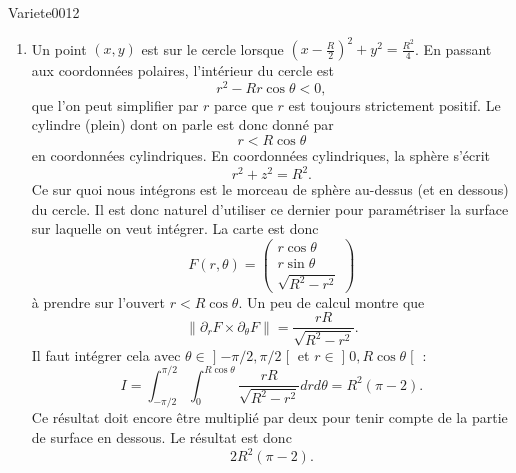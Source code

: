 \begin{corrige}{Variete0012}
\begin{enumerate}
		\item
			Un point $(x,y)$ est sur le cercle lorsque $(x-\frac{ R }{ 2 })^2+y^2=\frac{ R^2 }{ 4 }$. En passant aux coordonnées polaires, l'intérieur du cercle est
			\begin{equation}
				r^2-Rr\cos\theta<0,
			\end{equation}
			que l'on peut simplifier par $r$ parce que $r$ est toujours strictement positif. Le cylindre (plein) dont on parle est donc donné par
			\begin{equation}
				r<R\cos\theta
			\end{equation}
			en coordonnées cylindriques. En coordonnées cylindriques, la sphère s'écrit
			\begin{equation}
				r^2+z^2=R^2.
			\end{equation}
			Ce sur quoi nous intégrons est le morceau de sphère au-dessus (et en dessous) du cercle. Il est donc naturel d'utiliser ce dernier pour paramétriser la surface sur laquelle on veut intégrer. La carte est donc
			\begin{equation}		\label{EqParmsCylSphere}
				F(r,\theta)=\begin{pmatrix}
					r\cos\theta	\\ 
					r\sin\theta	\\ 
					\sqrt{R^2-r^2}	
				\end{pmatrix}
			\end{equation}
			à prendre sur l'ouvert $r<R\cos\theta$. Un peu de calcul montre que
			\begin{equation}
				\| \partial_rF\times\partial_{\theta}F \|=\frac{ rR }{ \sqrt{R^2-r^2} }.
			\end{equation}
			Il faut intégrer cela avec $\theta\in\mathopen] -\pi/2 , \pi/2 \mathclose[$ et $r\in\mathopen] 0 , R\cos\theta \mathclose[$ :
			\begin{equation}
				I=\int_{-\pi/2}^{\pi/2}\int_0^{R\cos\theta}\frac{ rR }{ \sqrt{R^2-r^2} }drd\theta=R^2(\pi-2).
			\end{equation}
			Ce résultat doit encore être multiplié par deux pour tenir compte de la partie de surface en dessous. Le résultat est donc
			\begin{equation}
				2R^2(\pi-2).
			\end{equation}
			

\end{enumerate}
\end{corrige}
